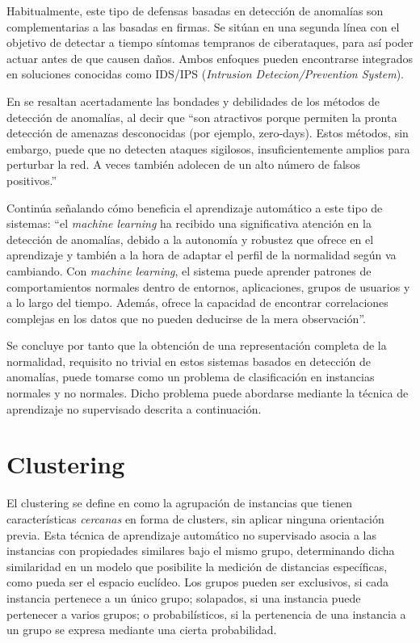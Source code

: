 Habitualmente, este tipo de defensas basadas en detección de anomalías son complementarias a las basadas en firmas.
Se sitúan en una segunda línea con el objetivo de detectar a tiempo síntomas tempranos de ciberataques, para así poder actuar antes de que causen daños.
Ambos enfoques pueden encontrarse integrados en soluciones conocidas como IDS/IPS (\emph{Intrusion Detecion/Prevention System}).

En \cite{Alconzo_2019} se resaltan acertadamente las bondades y debilidades de los métodos de detección de anomalías, al decir que ``son atractivos porque permiten la pronta detección de amenazas desconocidas (por ejemplo, zero-days).
Estos métodos, sin embargo, puede que no detecten ataques sigilosos, insuficientemente amplios para perturbar la red.
A veces también adolecen de un alto número de falsos positivos.''

Continúa señalando cómo beneficia el aprendizaje automático a este tipo de sistemas: ``el \emph{machine learning} ha recibido una significativa atención en la detección de anomalías, debido a
la autonomía y robustez que ofrece en el aprendizaje y también a la hora de adaptar el perfil de la normalidad según va cambiando.
Con \emph{machine learning}, el sistema puede aprender patrones de comportamientos normales dentro de entornos, aplicaciones, grupos de usuarios y a lo largo del tiempo.
Además, ofrece la capacidad de encontrar correlaciones complejas en los datos que no pueden deducirse de la mera observación''.

Se concluye por tanto que la obtención de una representación completa de la normalidad, requisito no trivial en estos sistemas basados en detección de anomalías, puede tomarse como
un problema de clasificación en instancias normales y no normales. Dicho problema puede abordarse mediante la técnica de aprendizaje no supervisado descrita a continuación.

\section{Clustering}\label{clustering}

El clustering se define en \cite{NA08} como la agrupación de instancias que tienen características \emph{cercanas} en forma de clusters, sin aplicar ninguna orientación previa.
Esta técnica de aprendizaje automático no supervisado asocia a las instancias con propiedades similares bajo el mismo grupo,
determinando dicha similaridad en un modelo que posibilite la medición de distancias específicas, como pueda ser el espacio euclídeo.
Los grupos pueden ser exclusivos, si cada instancia pertenece a un único grupo; solapados, si una instancia puede pertenecer a varios grupos; o probabilísticos, si la pertenencia de una instancia a un grupo se expresa mediante una cierta probabilidad.

